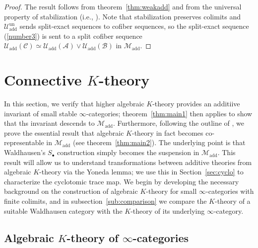 \documentclass{amsart}
\newcommand{\ssdot}{\bullet}%
\newcommand{\Sdot}[1][\ssdot]{S_{#1}}
\newcommand{\cA}{{\mathcal A}}
\newcommand{\cB}{{\mathcal B}}
\newcommand{\cC}{{\mathcal C}}
\newcommand{\cM}{{\mathcal M}}
\newcommand{\cU}{{\mathcal U}}
\renewcommand{\i}{\infty}
\newcommand{\Motadd}{\cM_{\mathrm{add}}}
\newcommand{\Umot}{\cU_{\mathrm{add}}}
\newcommand{\Umotun}{\cU_{\mathrm{add}}^{\mathrm{un}}}
\numberwithin{equation}{section}
\theoremstyle{definition}
\begin{document}
\begin{proof}
The result follows from theorem~\ref{thm:weakadd} and from the
universal property of stabilization (i.e., \cite[1.4.5.5]{HAG}). Note
that stabilization preserves colimits and $\Umotun$ sends split-exact sequences to cofiber sequences, so the split-exact
sequence (\ref{number3}) is sent to a split cofiber sequence $\Umot(\cC)\simeq \Umot(\cA)\vee\Umot(\cB)$
in $\Motadd$.
\end{proof}

\section{Connective $K$-theory}\label{sec:kthy}

In this section, we verify that higher algebraic $K$-theory provides
an additiive invariant of small stable $\i$-categories;
theorem~\ref{thm:main1} then applies to show that ths invariant
descends to $\Motadd$.  Furthermore, following the outline
of \cite{Duke}, we prove the essential result that algebraic
$K$-theory in fact becomes co-representable in $\Motadd$ (see
theorem~\ref{thm:main2}).  The underlying point is that Waldhausen's
$\Sdot$ construction simply becomes the suspension in $\Motadd$.  This
result will allow us to understand transformations between additive
theories from algebraic $K$-theory via the Yoneda lemma; we use this
in Section~\ref{sec:cyclo} to characterize the cyclotomic trace map.
We begin by developing the necessary background on the construction of
algebraic $K$-theory for small $\i$-categories with finite colimits,
and in subsection~\ref{sub:comparison} we compare the $K$-theory of a suitable Waldhausen category with the $K$-theory of its underlying $\i$-category.

\subsection{Algebraic $K$-theory of $\i$-categories}\label{sec:back-K}
\end{document}
